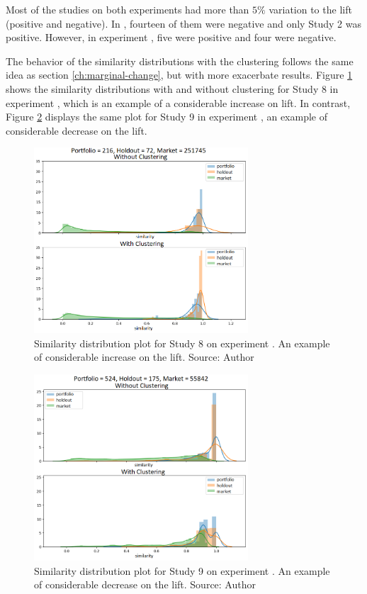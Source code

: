 Most of the studies on both experiments had more than $5\%$ variation to the lift (positive and negative). In \nameExperimentI{}, fourteen of them were negative and only Study 2 was positive. However, in experiment \nameExperimentII{}, five were positive and four were negative.

The behavior of the similarity distributions with the clustering follows the same idea as section \ref{ch:marginal-change}, but with more exacerbate results. Figure \ref{fig:study-8-considerable-increase-exp-2} shows the similarity distributions with and without clustering for Study 8 in experiment \nameExperimentII{}, which is an example of a considerable increase on lift. In contrast, Figure \ref{fig:study-9-considerable-decrease-exp-1} displays the same plot for Study 9 in experiment \nameExperimentI{}, an example of considerable decrease on the lift.

\begin{figure}[!ht]
   \centering
   \includegraphics[width=8cm]{fig/ch4-study-8-considerable-increase-exp-2.png}
   \caption{Similarity distribution plot for Study 8 on experiment \nameExperimentII{}. An example of considerable increase on the lift. Source: Author}
   \label{fig:study-8-considerable-increase-exp-2}
\end{figure}

\begin{figure}[!ht]
   \centering
   \includegraphics[width=8cm]{fig/ch4-study-9-considerable-decrease-exp-1.png}
   \caption{Similarity distribution plot for Study 9 on experiment \nameExperimentI{}. An example of considerable decrease on the lift. Source: Author}
   \label{fig:study-9-considerable-decrease-exp-1}
\end{figure}


